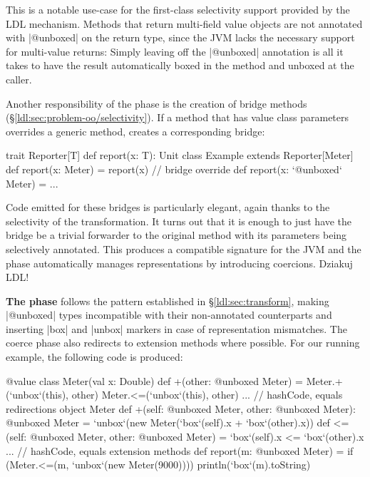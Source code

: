 This is a notable use-case for the first-class selectivity support provided by the LDL mechanism. Methods that return multi-field value objects are not annotated with |@unboxed| on the return type, since the JVM lacks the necessary support for multi-value returns: Simply leaving off the |@unboxed| annotation is all it takes to have the result automatically boxed in the method and unboxed at the caller.

Another responsibility of the \inject{} phase is the creation of bridge methods (\S\ref{ldl:sec:problem-oo/selectivity}). If a method that has value class parameters overrides a generic method, \inject{} creates a corresponding bridge:

\begin{lstlisting-nobreak}
 trait Reporter[T] {
   def report(x: T): Unit
 }
 class Example extends Reporter[Meter] {
   def report(x: Meter) = report(x) // bridge
   override def report(x: `@unboxed` Meter) = ...
 }
\end{lstlisting-nobreak}

Code emitted for these bridges is particularly elegant, again thanks to the selectivity of the transformation. It turns out that it is enough to just have the bridge be a trivial forwarder to the original method with its parameters being selectively annotated. This produces a compatible signature for the JVM and the \coerce{} phase automatically manages representations by introducing coercions. Dziakuj LDL!

\textbf{The \coerce{} phase} follows the pattern established in \S\ref{ldl:sec:transform}, making |@unboxed| types incompatible with their non-annotated counterparts and inserting |box| and |unbox| markers in case of representation mismatches. The coerce phase also redirects to extension methods where possible. For our running example, the following code is produced:

\begin{lstlisting-nobreak}
 @value class Meter(val x: Double) {
   def +(other: @unboxed Meter) =
     Meter.+(`unbox`(this), other)
     Meter.<=(`unbox`(this), other)
   ... // hashCode, equals redirections
 }
 object Meter {
   def +(self: @unboxed Meter, other: @unboxed Meter): @unboxed Meter = `unbox`(new Meter(`box`(self).x + `box`(other).x))
   def <=(self: @unboxed Meter, other: @unboxed Meter) = `box`(self).x <= `box`(other).x
   ... // hashCode, equals extension methods
 }
 def report(m: @unboxed Meter) = {
   if (Meter.<=(m, `unbox`(new Meter(9000))))
     println(`box`(m).toString)
 }
\end{lstlisting-nobreak}

